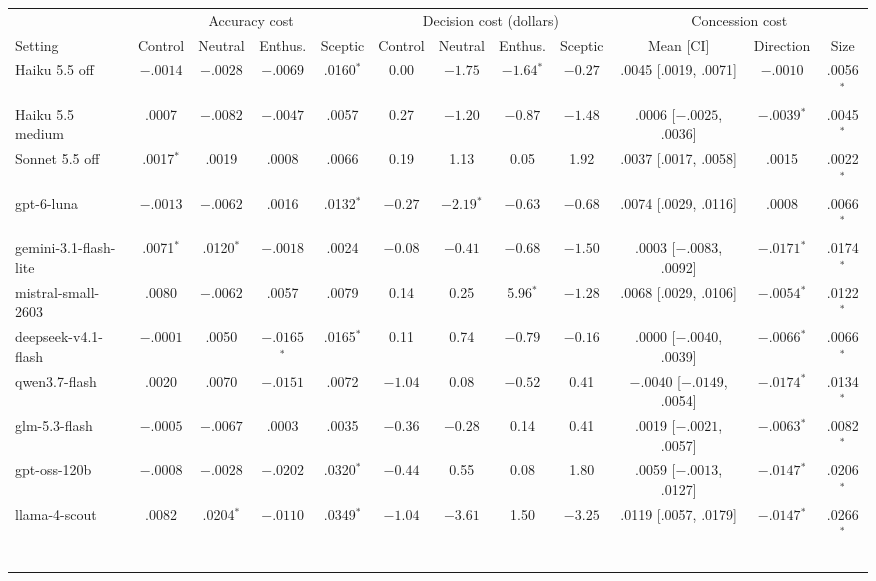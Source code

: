\begin{table}[t]
\centering
\scriptsize
\setlength{\tabcolsep}{2.5pt}
\begin{adjustbox}{max width=\linewidth}
\begin{tabular}{lccccccccccc}
\toprule
& \multicolumn{4}{c}{Accuracy cost} & \multicolumn{4}{c}{Decision cost (dollars)} & \multicolumn{3}{c}{Concession cost} \\
Setting & Control & Neutral & Enthus. & Sceptic & Control & Neutral & Enthus. & Sceptic & Mean [CI] & Direction & Size \\
\midrule
Haiku 5.5 off & $-.0014$ & $-.0028$ & $-.0069$ & .0160$^{*}$ & 0.00 & $-1.75$ & $-1.64$$^{*}$ & $-0.27$ & .0045 [.0019, .0071] & $-.0010$ & .0056$^{*}$ \\
Haiku 5.5 medium & .0007 & $-.0082$ & $-.0047$ & .0057 & 0.27 & $-1.20$ & $-0.87$ & $-1.48$ & .0006 [$-.0025$, .0036] & $-.0039$$^{*}$ & .0045$^{*}$ \\
Sonnet 5.5 off & .0017$^{*}$ & .0019 & .0008 & .0066 & 0.19 & 1.13 & 0.05 & 1.92 & .0037 [.0017, .0058] & .0015 & .0022$^{*}$ \\
gpt-6-luna & $-.0013$ & $-.0062$ & .0016 & .0132$^{*}$ & $-0.27$ & $-2.19$$^{*}$ & $-0.63$ & $-0.68$ & .0074 [.0029, .0116] & .0008 & .0066$^{*}$ \\
gemini-3.1-flash-lite & .0071$^{*}$ & .0120$^{*}$ & $-.0018$ & .0024 & $-0.08$ & $-0.41$ & $-0.68$ & $-1.50$ & .0003 [$-.0083$, .0092] & $-.0171$$^{*}$ & .0174$^{*}$ \\
mistral-small-2603 & .0080 & $-.0062$ & .0057 & .0079 & 0.14 & 0.25 & 5.96$^{*}$ & $-1.28$ & .0068 [.0029, .0106] & $-.0054$$^{*}$ & .0122$^{*}$ \\
deepseek-v4.1-flash & $-.0001$ & .0050 & $-.0165$$^{*}$ & .0165$^{*}$ & 0.11 & 0.74 & $-0.79$ & $-0.16$ & .0000 [$-.0040$, .0039] & $-.0066$$^{*}$ & .0066$^{*}$ \\
qwen3.7-flash & .0020 & .0070 & $-.0151$ & .0072 & $-1.04$ & 0.08 & $-0.52$ & 0.41 & $-.0040$ [$-.0149$, .0054] & $-.0174$$^{*}$ & .0134$^{*}$ \\
glm-5.3-flash & $-.0005$ & $-.0067$ & .0003 & .0035 & $-0.36$ & $-0.28$ & 0.14 & 0.41 & .0019 [$-.0021$, .0057] & $-.0063$$^{*}$ & .0082$^{*}$ \\
gpt-oss-120b & $-.0008$ & $-.0028$ & $-.0202$ & .0320$^{*}$ & $-0.44$ & 0.55 & 0.08 & 1.80 & .0059 [$-.0013$, .0127] & $-.0147$$^{*}$ & .0206$^{*}$ \\
llama-4-scout & .0082 & .0204$^{*}$ & $-.0110$ & .0349$^{*}$ & $-1.04$ & $-3.61$ & 1.50 & $-3.25$ & .0119 [.0057, .0179] & $-.0147$$^{*}$ & .0266$^{*}$ \\
$$
\end{tabular}
\end{adjustbox}
\end{table}
